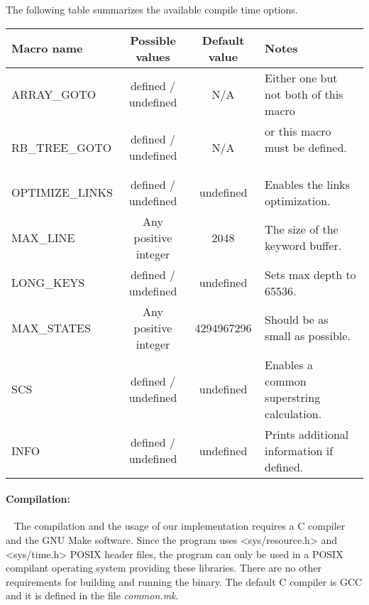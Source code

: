 \documentclass[english,twoside,censored,csm,algorithms-track-2020]{HYthesisML}
\theoremstyle{plain}
\theoremstyle{definition}
\begin{document}
The following table summarizes the available compile time options.\\

\hspace{-1.7cm}
  \begin{tabular}{ |l|c|c|l| }
    \hline
    \textbf{Macro name} & \textbf{Possible values} & \textbf{Default value} & \textbf{Notes} \\
 \hline
 ARRAY\_GOTO & defined / undefined & N/A & Either one but not both of this macro \\
 RB\_TREE\_GOTO & defined / undefined & N/A & or this macro must be defined. ~~~ \\
 OPTIMIZE\_LINKS & defined / undefined  & undefined & Enables the links optimization.\\
 MAX\_LINE & Any positive integer & 2048 & The size of the keyword buffer. \\
 LONG\_KEYS & defined / undefined & undefined & Sets max depth to 65536. \\
 MAX\_STATES & Any positive integer & 4294967296 & Should be as small as possible. \\
 SCS & defined / undefined & undefined & Enables a common superstring calculation. \\
 INFO & defined / undefined & undefined & Prints additional information if defined.\\
 \hline
  \end{tabular}




\paragraph{Compilation:}~\label{usage}
The compilation and the usage of our implementation requires a C compiler and the GNU Make software.
Since the program uses <sys/resource.h> and <sys/time.h> POSIX header files, the program can only
be used in a POSIX compilant operating system providing these libraries. There are no other
requirements for building and running the binary. The default C compiler is GCC and it is defined in the
file \textit{common.mk}.
\end{document}
